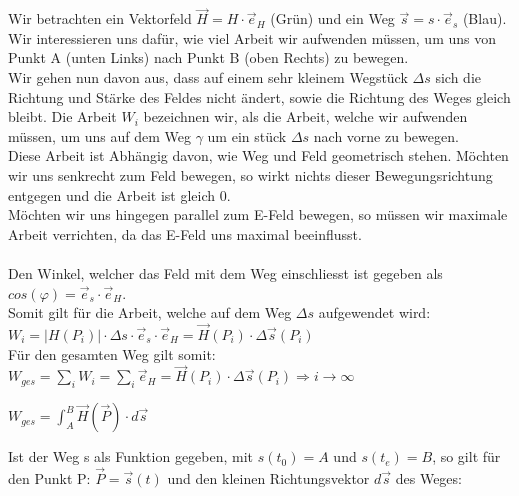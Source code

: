 \iend
{}
\beginip
Wir betrachten ein Vektorfeld $\vec{H} = H \cdot \vec{e}_H$  (Grün) und ein Weg $\vec{s} = s \cdot \vec{e}_s$ (Blau). \\
Wir interessieren uns dafür, wie viel Arbeit wir aufwenden müssen, um uns von Punkt A (unten Links) nach Punkt B (oben Rechts) zu bewegen. \\
Wir gehen nun davon aus, dass auf einem sehr kleinem Wegstück $\Delta s$ sich die Richtung und Stärke des Feldes nicht ändert, sowie die Richtung des Weges gleich bleibt.
Die Arbeit $W_i$ bezeichnen wir, als die Arbeit, welche wir aufwenden müssen, um uns auf dem Weg $\gamma$ um ein stück $\Delta s$ nach vorne zu bewegen. \\
Diese Arbeit ist Abhängig davon, wie Weg und Feld geometrisch stehen. Möchten wir uns senkrecht zum Feld bewegen, so wirkt nichts dieser Bewegungsrichtung entgegen und die  Arbeit ist gleich 0. \\
Möchten wir uns hingegen parallel zum E-Feld bewegen, so müssen wir maximale Arbeit verrichten, da das E-Feld uns maximal beeinflusst. \\
\\
Den Winkel, welcher das Feld mit dem Weg einschliesst ist gegeben als $ cos(\varphi) = \vec{e}_s \cdot \vec{e}_H$. \\
Somit gilt für die Arbeit, welche auf dem Weg $\Delta s$ aufgewendet wird: $W_i = |H(P_i)| \cdot \Delta s \cdot  \vec{e}_s \cdot \vec{e}_H = \vec{H}(P_i) \cdot \Delta \vec{s}(P_i)$ \\
Für den gesamten Weg gilt somit:
$\displaystyle W_{ges} = \sum_i W_i = \sum_i \vec{e}_H = \vec{H}(P_i) \cdot \Delta \vec{s}(P_i) \Rightarrow i\rightarrow \infty $

\begin{center}
	$ W_{ges} = \int_A^B \vec{H}(\vec{P})\cdot d\vec{s} $
\end{center}
Ist der Weg s als Funktion gegeben, mit $s(t_0) = A $ und $s(t_e) = B$, so gilt für den Punkt P: $\vec{P} = \vec{s}(t)$ und den kleinen Richtungsvektor $ d\vec{s}$  des Weges: \\


